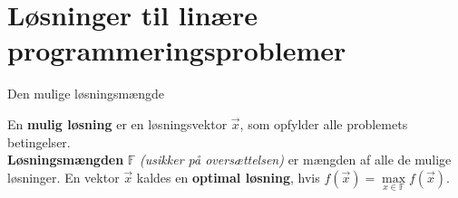 \section{Løsninger til linære programmeringsproblemer}

Den mulige løsningsmængde 

\begin{defn}
En \textbf{mulig løsning} er en løsningsvektor $\vec{x}$, som opfylder alle problemets betingelser.\\
\textbf{Løsningsmængden} $\mathds{F}$ \textit{(usikker på oversættelsen)} er mængden af alle de mulige løsninger.
En vektor $\vec{x}$ kaldes en \textbf{optimal løsning}, hvis $f(\vec{x})=\max\limits_{x \in \mathds{F}}f(\vec{x}).$
\end{defn}

